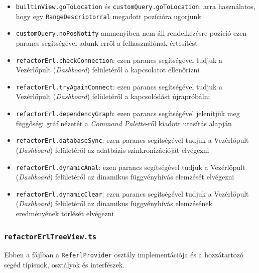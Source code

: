 \begin{itemize}
    \item \lstinline{builtinView.goToLocation} és \lstinline{customQuery.goToLocation}: arra használatos, hogy egy \lstinline{RangeDescriptorral} megadott pozícióra ugorjunk
    
    \item \lstinline{customQuery.noPosNotify} ammenyiben nem áll rendelkezésre pozíció ezen parancs segítségével adunk erről a felhasználónak értesítést
    
    \item \lstinline{refactorErl.checkConnection}: ezen parancs segítségével tudjuk a Vezérlőpult (\textit{Dashboard}) felületéről a kapcsolatot ellenőrizni
    
    \item \lstinline{refactorErl.tryAgainConnect}: ezen parancs segítségével tudjuk a Vezérlőpult (\textit{Dashboard}) felületéről a kapcsolódást újrapróbálni
    
    \item \lstinline{refactorErl.dependencyGraph}: ezen parancs segítségével jelenítjük meg függőségi gráf nézetét a \textit{Command Palette}-ről kiadott utasítás alapján
    
    \item \lstinline{refactorErl.databaseSync}:  ezen parancs segítségével tudjuk a Vezérlőpult (\textit{Dashboard}) felületéről az adatbázis szinkronizációját elvégezni
    
    
    \item \lstinline{refactorErl.dynamicAnal}: ezen parancs segítségével tudjuk a Vezérlőpult (\textit{Dashboard}) felületéről az dinamikus függvényhívás elemzését elvégezni
    
    \item \lstinline{refactorErl.dynamicClear}: ezen parancs segítségével tudjuk a Vezérlőpult (\textit{Dashboard}) felületéről az dinamikus függvényhívás elemzésének eredményének törlését elvégezni
    
\end{itemize}


\subsubsection{\lstinline{refactorErlTreeView.ts}}

Ebben a fájlban a \lstinline{ReferlProvider} osztály implementációja és a hozzátartozó segéd típisuok, osztályok és interfészek.

